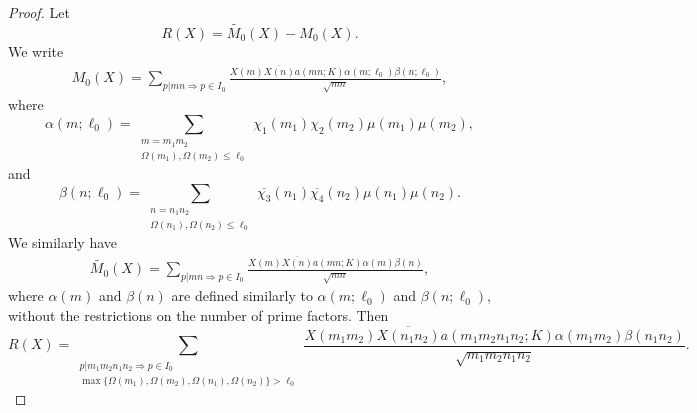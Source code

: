 \documentclass[12pt, reqno]{amsart}
\numberwithin{equation}{section}
\numberwithin{theorem}{section}
\numberwithin{equation}{section}
\begin{document}
\begin{proof}
 Let $$R(X) = \widetilde{M_0}(X)-M_0(X).$$ We write
 \begin{align*}
     M_0(X) = \sum_{p | mn \Rightarrow p \in I_0} \frac{X(m) \overline{X(n)} a(mn;K) \alpha(m;\ell_0) \beta(n;\ell_0)}{\sqrt{mn}},
 \end{align*}
 where
 $$ \alpha(m;\ell_0) = \sum_{\substack{m=m_1 m_2 \\ \Omega(m_1),\Omega(m_2) \leq \ell_0}} \chi_1(m_1) \chi_2(m_2) \mu(m_1) \mu(m_2),$$ and 
 $$ \beta(n;\ell_0)= \sum_{\substack{n=n_1 n_2 \\ \Omega(n_1),\Omega(n_2) \leq \ell_0}} \overline{\chi_3}(n_1) \overline{\chi_4}(n_2) \mu(n_1) \mu(n_2).$$
 We similarly have
 \begin{align*}
     \widetilde{M_0}(X) = \sum_{p | mn \Rightarrow p \in I_0} \frac{X(m) \overline{X(n)} a(mn;K) \alpha(m) \beta(n)}{\sqrt{mn}},
 \end{align*}
 where $\alpha(m)$ and $\beta(n)$ are defined similarly to $\alpha(m;\ell_0)$ and $\beta(n;\ell_0)$, without the restrictions on the number of prime factors. Then
 $$R(X) = \sum_{\substack{p | m_1m_2n_1n_2 \Rightarrow p \in I_0 \\ \max\{\Omega(m_1), \Omega(m_2),\Omega(n_1),\Omega(n_2)\}>\ell_0}} \frac{X(m_1m_2) \overline{X(n_1n_2)} a(m_1m_2n_1n_2;K) \alpha(m_1m_2) \beta(n_1n_2)}{\sqrt{m_1m_2n_1n_2}}.$$


\end{proof}
\end{document}
